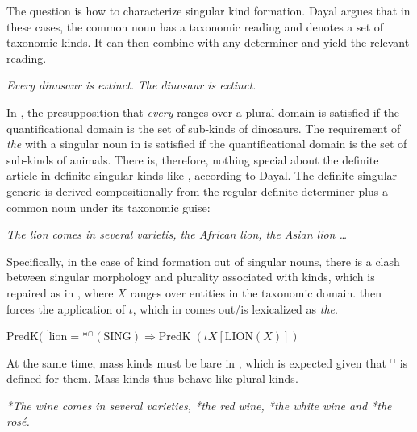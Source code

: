 \documentclass[output=paper,
modfonts
]{langscibook}
\begin{document}
	The question is how to characterize singular kind formation. Dayal argues that in these cases, the common noun has a taxonomic reading and denotes a set of taxonomic kinds. It can then combine with any determiner and yield the relevant reading.
	
	\ea \label{ex:despic:40}
	\ea \label{ex:despic:40a}
	\textit{Every dinosaur is extinct.} 
	\ex \label{ex:despic:40b}
	\textit{The dinosaur is extinct.}
	\z
	\z 
	
	In , the presupposition that \textit{every} ranges over a plural domain is satisfied if the
	quantificational domain is the set of sub-kinds of dinosaurs. The  requirement of \textit{the} with a singular noun in  is satisfied if the quantificational domain is the set of sub-kinds of animals. There is, therefore, nothing special about the definite article in definite singular kinds like , according to Dayal. The definite singular generic is derived compositionally from the regular definite determiner plus a common noun under its taxonomic guise:
	
	\ea \label{ex:despic:41}
	\textit{The lion comes in several varietis, the African lion, the Asian lion \ldots}
	\z 
	
	Specifically, in the case of kind formation out of singular nouns, there is a clash between singular morphology and plurality associated with kinds, which is repaired as in , where $X$ ranges over entities in the taxonomic domain.  then forces the application of $\iota$, which in  comes out/is lexicalized as \textit{the}.
	
	\ea \label{ex:despic:42}
	$\textrm{PredK}(^\cap\textrm{lion}=$*$^\cap(\textrm{SING})\Rightarrow\textrm{PredK}\;(\iota X[\textrm{LION}(X)])$ \citep[435]{Dayal2004}
	\z 
	
	At the same time, mass kinds must be bare in  , which is expected given that $^\cap$ is defined for them. Mass kinds thus behave like plural kinds.
	
	\ea \label{ex:despic:43}
	\textit{{\op}\textnormal{*}The{\cp} wine comes in several varieties, {\op}\textnormal{*}the{\cp} red wine, {\op}\textnormal{*}the{\cp} white wine and {\op}\textnormal{*}the{\cp} ros\'e.}
	\z 
	
\end{document}
